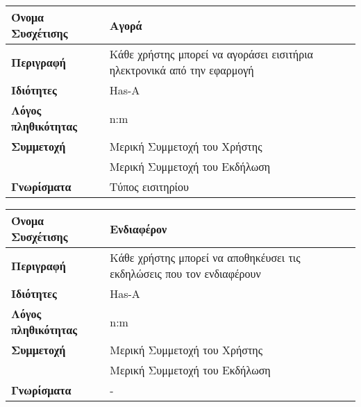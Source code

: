 \begin{center}
\begin{tabular}[]{|p{4cm}|p{10cm}|}
  \hline
  \textbf{Όνομα Συσχέτισης}   & Αγορά                                                                  \\  \hline
  \textbf{Περιγραφή}          & Κάθε χρήστης μπορεί να αγοράσει εισιτήρια ηλεκτρονικά από την εφαρμογή \\ \hline
  \textbf{Ιδιότητες}          & Has-A                                                                  \\ \hline
  \textbf{Λόγος πληθικότητας} & n:m                                                                    \\ \hline
  \textbf{Συμμετοχή}          & Mερική Συμμετοχή του Χρήστης                                           \\ \cline{2-2}
                              & Μερική Συμμετοχή του Εκδήλωση                                          \\ \hline
  \textbf{Γνωρίσματα}         & Τύπος εισιτηρίου                                                       \\ \hline
\end{tabular}
\vspace{0.3 cm}






\begin{tabular}[]{|p{4cm}|p{10cm}|}
  \hline
  \textbf{Όνομα Συσχέτισης} & Ενδιαφέρον \\  \hline
  \textbf{Περιγραφή} & Κάθε χρήστης μπορεί να αποθηκέυσει τις εκδηλώσεις που τον ενδιαφέρουν \\ \hline
  \textbf{Ιδιότητες} & Has-A \\ \hline
  \textbf{Λόγος πληθικότητας} & n:m \\ \hline
  \textbf{Συμμετοχή} & Mερική Συμμετοχή του Χρήστης \\ \cline{2-2}
                     & Μερική Συμμετοχή του Εκδήλωση \\ \hline
  \textbf{Γνωρίσματα} & - \\ \hline
\end{tabular}
\vspace{0.3 cm}


\end{center}
